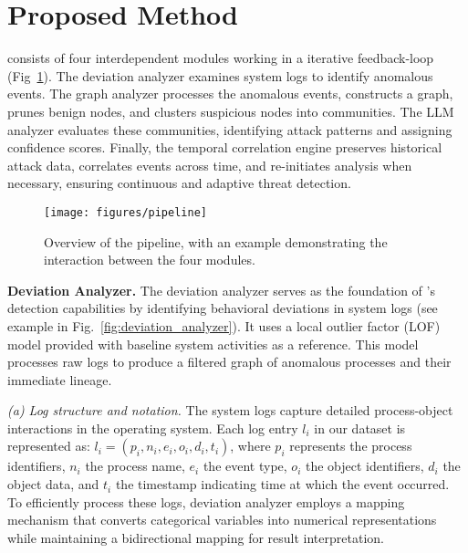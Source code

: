 \section{\label{sec:method}Proposed Method}

\method consists of four interdependent modules working in a iterative feedback-loop (Fig~\ref{fig:pipeline}). 
The deviation analyzer examines system logs to identify anomalous events. 
The graph analyzer processes the anomalous events, constructs a graph, prunes benign nodes, and clusters suspicious nodes into communities. 
The LLM analyzer evaluates these communities, identifying attack patterns and assigning confidence scores. 
Finally, the temporal correlation engine preserves historical attack data, correlates events across time, and re-initiates analysis when necessary, ensuring continuous and adaptive threat detection.

\begin{figure}[ht]
\setlength{\abovecaptionskip}{3pt}
\setlength{\belowcaptionskip}{0pt}
\centering
\texttt{[image: figures/pipeline]}
\caption{Overview of the \method pipeline, with an example demonstrating the interaction between the four modules.}
\label{fig:pipeline}
\end{figure}

\noindent\textbf{Deviation Analyzer. }
The deviation analyzer serves as the foundation of \method's detection capabilities by identifying behavioral deviations in system logs (see example in Fig.~\ref{fig:deviation_analyzer}). 
It uses a local outlier factor (LOF) model provided with baseline system activities as a reference.
This model processes raw logs to produce a filtered graph of anomalous processes and their immediate lineage. %

\noindent\textit{(a) Log structure and notation.} The system logs capture detailed process-object interactions in the operating system. 
Each log entry $l_i$ in our dataset is represented as: 
  $l_i = (p_i, n_i, e_i, o_i, d_i, t_i)$,
where $p_i$ represents the process identifiers, $n_i$ the process name, $e_i$ the event type, $o_i$ the object identifiers, $d_i$ the object data, and $t_i$ the timestamp indicating time at which the event occurred. 
To efficiently process these logs, deviation analyzer employs a mapping mechanism that converts categorical variables into numerical representations while maintaining a bidirectional mapping for result interpretation.

